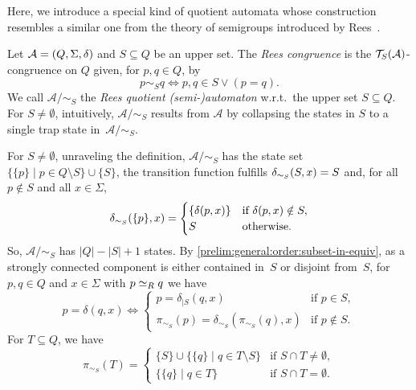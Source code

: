
Here, we introduce a special kind of quotient automata
whose construction resembles a similar one from the theory of semigroups
introduced by Rees~\cite{Rees40}.

Let $\mathcal A = (Q, \Sigma, \delta)$ and $S \subseteq Q$ be an upper set. 
The \emph{Rees congruence} is the  $\mathcal T_S(\mathcal A)$-congruence on $Q$
given, for $p, q \in Q$, by \label{def:Rees_congruence}
\[ 
p \sim_S q \Leftrightarrow p,q \in S \lor (p = q).
\]
We call $\mathcal A / {\sim_S}$
the \emph{Rees quotient (semi-)automaton}
w.r.t.~the upper set $S \subseteq Q$.  For $S \ne \emptyset$, intuitively, 
$\mathcal A / {\sim_S}$
results from $\mathcal A$ by collapsing the states in $S$
to a single trap state in~$\mathcal A / {\sim_S}$.

\begin{remark}\label{prelim:rem:Rees}
	For $S \ne \emptyset$, unraveling the definition, $\mathcal A / {\sim_S}$ 
	has the state set $\{ \{p\} \mid p \in Q \setminus S \} \cup \{ S \}$,
	the transition function fulfills $\delta_{\sim_S}(S,x) = S$ and, 
	for all $p \notin S$ and all $x \in \Sigma$, 
	\begin{equation}\label{prelim:eqn:reestrans}
		\delta_{\sim_S}(\{p\},x) = \begin{cases}
			\{ \delta(p,x) \} & \text{if } \delta(p,x) \notin S, \\ 
			S                               & \text{otherwise}.
		\end{cases}
	\end{equation}	
    So, $\mathcal A / {\sim_S}$ has $|Q| - |S| + 1$ states.
    By \cref{prelim:general:order:subset-in-equiv}, 
    as a strongly connected component
    is either contained in~$S$ or disjoint from~$S$, for $p,q \in Q$ and $x \in \Sigma$ with $p \simeq_R q$
    we have
    \begin{equation}\label{prelim:eqn:reestransS}
    p = \delta(q, x) \Leftrightarrow 
    \begin{cases}
    p = \delta_{|S}(q, x) & \text{if } p \in S, \\
    \pi_{\sim_S}(p) = \delta_{\sim_S}(\pi_{\sim_S}(q), x) & \text{if } p \notin S.
    \end{cases}
    \end{equation}  	
	For $T \subseteq Q$,
    we have 
    \begin{equation}\label{prelim:eqn:Reesproj}
    \pi_{\sim_S}(T) = 
    \begin{cases}
    \{ S \} \cup \{ \{q\} \mid q\in T \setminus S \} & \text{if } S \cap T \ne \emptyset, \\
    \{ \{q\} \mid q \in T \}                         & \text{if } S \cap T = \emptyset.    	
    \end{cases}
\end{equation}
\end{remark}

